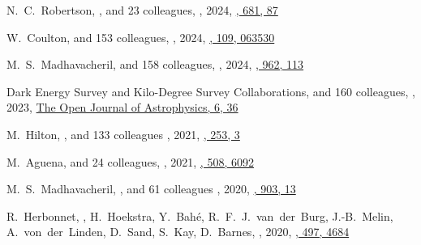 \begin{etaremune}
\item
N.~C.~Robertson, \myself, and 23 colleagues,
,
2024, \href{https://ui.adsabs.harvard.edu/abs/2024A&A...681A..87R/abstract}{\aap, 681, 87}

\item
W.~Coulton, and 153 colleagues,
,
2024, \href{https://ui.adsabs.harvard.edu/abs/2024PhRvD.109f3530C}{\prd, 109, 063530}

\item
M.~S.~Madhavacheril, and 158 colleagues,
,
2024, \href{https://ui.adsabs.harvard.edu/abs/2024ApJ...962..113M}{\apj, 962, 113}

\item
Dark Energy Survey and Kilo-Degree Survey Collaborations, and 160 colleagues,
,
2023, \href{https://ui.adsabs.harvard.edu/abs/2023OJAp....6E..36D}{The Open Journal of Astrophysics, 6, 36}

\item
M.~Hilton, \myself, and 133 colleagues
,
2021, \href{https://ui.adsabs.harvard.edu/abs/2021ApJS..253....3H/abstract}{\apjs, 253, 3}

\item
M.~Aguena, and 24 colleagues,
,
2021, \href{https://ui.adsabs.harvard.edu/abs/2021MNRAS.508.6092A}{\mnras, 508, 6092}

\item
M.~S.~Madhavacheril, \myself, and 61 colleagues
,
2020, \href{https://ui.adsabs.harvard.edu/abs/2020ApJ...903L..13M/abstract}{\apjl, 903, 13}

\item
R.~Herbonnet, \myself, H.~Hoekstra, Y.~Bah\'e, R.~F.~J.~van~der~Burg, 
J.-B.~Melin, A.~von~der~Linden, D.~Sand, S.~Kay, D.~Barnes,
,
2020, \href{https://ui.adsabs.harvard.edu/abs/2020MNRAS.497.4684H/abstract}{\mnras, 497, 4684}


\end{etaremune}

